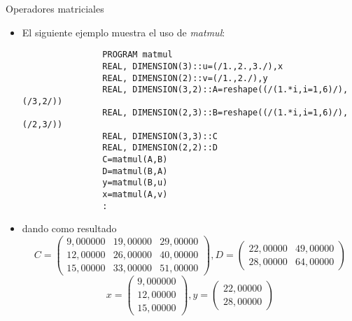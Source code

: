 \begin{frame}[fragile]{Operadores matriciales} 
    \begin{itemize}[<+(0)->]
        \item [] El siguiente ejemplo muestra el uso de \emph{matmul}:
        \vspace{0.1cm}
            \begin{verbatim}
                PROGRAM matmul
                REAL, DIMENSION(3)::u=(/1.,2.,3./),x
                REAL, DIMENSION(2)::v=(/1.,2./),y
                REAL, DIMENSION(3,2)::A=reshape((/(1.*i,i=1,6)/),(/3,2/))
                REAL, DIMENSION(2,3)::B=reshape((/(1.*i,i=1,6)/),(/2,3/))
                REAL, DIMENSION(3,3)::C
                REAL, DIMENSION(2,2)::D
                C=matmul(A,B)
                D=matmul(B,A)
                y=matmul(B,u)
                x=matmul(A,v)
                :
            \end{verbatim}
        \item [] dando como resultado
        \small
            \begin{equation*}
            C = \begin{pmatrix}
                    9,000000 & 19,00000 & 29,00000\\
                    12,00000 & 26,00000 & 40,00000\\
                    15,00000 & 33,00000 & 51,00000    
                \end{pmatrix},    
            D = \begin{pmatrix}
                    22,00000 & 49,00000\\
                    28,00000 & 64,00000
                \end{pmatrix}  
            \end{equation*}
            \begin{equation*}
            x = \begin{pmatrix}
                    9,000000\\
                    12,00000\\ 
                    15,00000
                \end{pmatrix},  
            y = \begin{pmatrix}
                    22,00000\\
                    28,00000
                \end{pmatrix}
            \end{equation*}      
    \end{itemize}
\end{frame}


